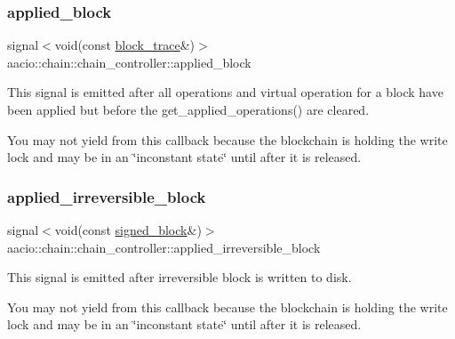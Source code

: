 \subsubsection{\texorpdfstring{applied\+\_\+block}{applied\_block}}
{\footnotesize\ttfamily signal$<$void(const \mbox{\hyperlink{structaacio_1_1chain_1_1block__trace}{block\+\_\+trace}}\&)$>$ aacio\+::chain\+::chain\+\_\+controller\+::applied\+\_\+block}

This signal is emitted after all operations and virtual operation for a block have been applied but before the get\+\_\+applied\+\_\+operations() are cleared.

You may not yield from this callback because the blockchain is holding the write lock and may be in an \char`\"{}inconstant state\char`\"{} until after it is released. \mbox{\label{classaacio_1_1chain_1_1chain__controller_a7f1e1bd702485d5028ca8378d91cc828}} 
\subsubsection{\texorpdfstring{applied\+\_\+irreversible\+\_\+block}{applied\_irreversible\_block}}
{\footnotesize\ttfamily signal$<$void(const \mbox{\hyperlink{structaacio_1_1chain_1_1signed__block}{signed\+\_\+block}}\&)$>$ aacio\+::chain\+::chain\+\_\+controller\+::applied\+\_\+irreversible\+\_\+block}

This signal is emitted after irreversible block is written to disk.

You may not yield from this callback because the blockchain is holding the write lock and may be in an \char`\"{}inconstant state\char`\"{} until after it is released. \mbox{\label{classaacio_1_1chain_1_1chain__controller_ab1f8e21220b27a47ce3ed85bf8415497}} 
